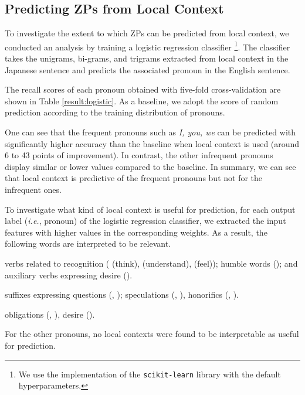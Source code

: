 \subsection{Predicting ZPs from Local Context}
To investigate the extent to which ZPs can be predicted from local context, we conducted an analysis by training a logistic regression classifier \footnote{We use the implementation of the \texttt{scikit-learn} library with the default hyperparameters.}.
The classifier takes the unigrams, bi-grams, and trigrams extracted from local context in the Japanese sentence and predicts the associated pronoun in the English sentence.

The recall scores of each pronoun obtained with five-fold cross-validation are shown in Table \ref{result:logistic}. As a baseline, we adopt the score of random prediction according to the training distribution of pronouns.

One can see that the frequent pronouns such as \textit{I, you, we} can be predicted with significantly higher accuracy than the baseline when local context is used (around 6 to 43 points of improvement). In contrast, the other infrequent pronouns display similar or lower values compared to the baseline.
In summary, we can see that local context is predictive of the frequent pronouns but not for the infrequent ones.

To investigate what kind of local context is useful for prediction, for each output label ({\it i.e.}, pronoun) of the logistic regression classifier, we extracted the input features with higher values in the corresponding weights.
As a result, the following words are interpreted to be relevant.

verbs related to recognition ( (think),  (understand),  (feel)); humble words (); and auxiliary verbs expressing desire ().

suffixes expressing questions (, ); speculations (, ), honorifics (, ).

obligations (, ), desire ().

For the other pronouns, no local contexts were found to be interpretable as useful for prediction.
